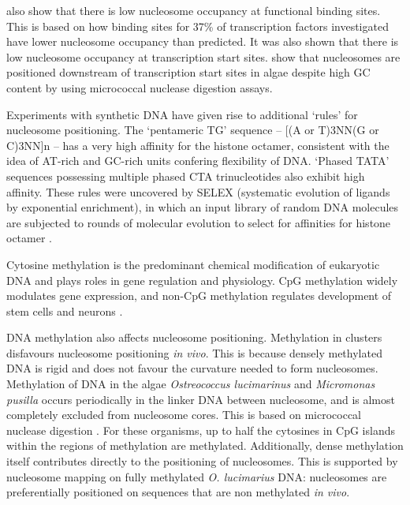 \documentclass[parskip=full, numbers=noenddot]{scrreprt}
\begin{document}
\citet{segal_genomic_2006} also show that there is low nucleosome occupancy at functional binding sites.  This is based on how binding sites for 37\% of transcription factors investigated have lower nucleosome occupancy than predicted.  It was also shown that there is low nucleosome occupancy at transcription start sites.  \citet{huff_dnmt1-independent_2014} show that nucleosomes are positioned downstream of transcription start sites in algae despite high GC content by using micrococcal nuclease digestion assays.

Experiments with synthetic DNA have given rise to additional `rules' for nucleosome positioning.  The `pentameric TG' sequence -- [(A or T)3NN(G or C)3NN]n -- has a very high affinity for the histone octamer, consistent with the idea of AT-rich and GC-rich units confering flexibility of DNA.  `Phased TATA' sequences possessing multiple phased CTA trinucleotides also exhibit high affinity.  These rules were uncovered by SELEX (systematic evolution of ligands by exponential enrichment), in which an input library of random DNA molecules are subjected to rounds of molecular evolution to select for affinities for histone octamer \cite{lowary_new_1998}.


Cytosine methylation is the predominant chemical modification of eukaryotic DNA and plays roles in gene regulation and physiology.  CpG methylation widely modulates gene expression, and non-CpG methylation regulates development of stem cells and neurons \citep{guo_distribution_2014}.

DNA methylation also affects nucleosome positioning.  Methylation in clusters disfavours nucleosome positioning \emph{in vivo}. This is because densely methylated DNA is rigid and does not favour the curvature needed to form nucleosomes.
Methylation of DNA in the algae \emph{Ostreococcus lucimarinus} and \emph{Micromonas pusilla} occurs periodically in the linker DNA between nucleosome, and is almost completely excluded from nucleosome cores.  This is based on micrococcal nuclease digestion \citep{huff_dnmt1-independent_2014}.  For these organisms, up to half the cytosines in CpG islands within the regions of methylation are methylated.  Additionally, dense methylation itself contributes directly to the positioning of nucleosomes.  This is supported by nucleosome mapping on fully methylated \emph{O. lucimarius} DNA: nucleosomes are preferentially positioned on sequences that are non methylated \emph{in vivo}.
\end{document}
